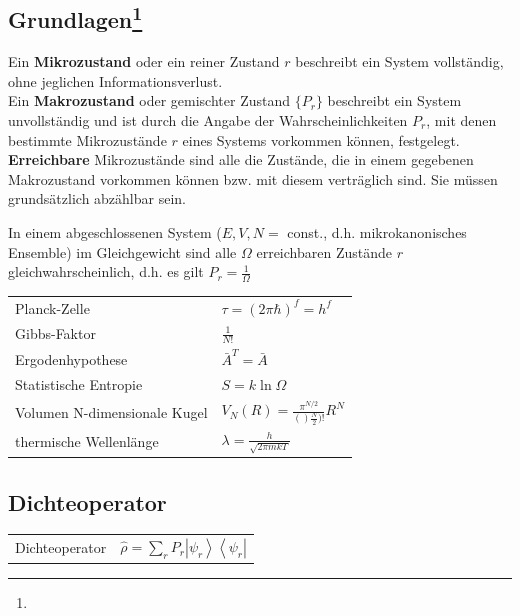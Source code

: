 \documentclass[12pt,a4paper]{article}
\newcommand{\ket}[1]{\left| #1 \right>}
\newcommand{\bra}[1]{\left< #1 \right|}
\renewcommand{\=}[1]{\stackrel{#1}{=}}
\theoremstyle{definition}
\theoremstyle{remark}
\begin{document}
\subsection[Grundlagen]{Grundlagen\let\thefootnote\relax\footnote{}}

\noindent Ein \textbf{Mikrozustand} oder ein reiner Zustand $r$ beschreibt ein System vollständig, ohne jeglichen Informationsverlust.\\

\noindent Ein \textbf{Makrozustand} oder gemischter Zustand $\{P_r\}$ beschreibt ein System unvollständig und ist durch die Angabe der Wahrscheinlichkeiten $P_r$, mit denen bestimmte Mikrozustände $r$ eines Systems vorkommen können, festgelegt.\\

\noindent \textbf{Erreichbare} Mikrozustände sind alle die Zustände, die in einem gegebenen Makrozustand vorkommen können bzw. mit diesem verträglich sind. Sie müssen grundsätzlich abzählbar sein.\\

\begin{framed}\noindent In einem abgeschlossenen System ($E, V, N = $ const., d.h. mikrokanonisches Ensemble) im Gleichgewicht sind alle $\Omega$ erreichbaren Zustände $r$ gleichwahrscheinlich, d.h. es gilt $P_r = \frac{1}{\Omega}$ \end{framed}

\begin{flushleft}
\begin{tabular}{ll}
Planck-Zelle & $\tau = (2\pi \hbar)^f = h^f$\\
Gibbs-Faktor & $\frac{1}{N!}$\\
Ergodenhypothese & $\bar A^T = \bar A$\\
Statistische Entropie & $S = k \ln \Omega$\\
Volumen N-dimensionale Kugel & $V_N(R) = \frac{\pi^{N/2}}{()\frac{N}{2})!}R^N$\\
thermische Wellenlänge & $\lambda = \frac{h}{\sqrt{2\pi m k T}}$\\
\end{tabular}
\end{flushleft}

\subsection{Dichteoperator}


\begin{flushleft}
\begin{tabular}{ll}
Dichteoperator & $\hat \rho = \sum_r P_r \ket{\psi_r}\bra{\psi_r}$\\
\end{tabular}
\end{flushleft}
\end{document}
